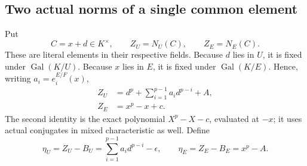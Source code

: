 \documentclass[11pt]{amsart}
\theoremstyle{definition}
\theoremstyle{remark}
\newcommand{\Gal}{\operatorname{Gal}}
\begin{document}
\subsection{Two actual norms of a single common element}
Put
\begin{equation}\label{O:I:commonC}
 C=x+d\in K^\times,\qquad Z_U=N_U(C),\qquad Z_E=N_E(C).
\end{equation}
These are literal elements in their respective fields. Because $d$ lies in
$U$, it is fixed under $\Gal(K/U)$. Because $x$ lies in $E$, it is fixed
under $\Gal(K/E)$. Hence, writing $a_i=e_i^{E/F}(x)$,
\begin{align}
 Z_U&=d^p+\sum_{i=1}^{p-1}a_i d^{p-i}+A,\label{O:I:ZU}\\
 Z_E&=x^p-x+c.\label{O:I:ZE}
\end{align}
The second identity is the exact polynomial $X^p-X-c$, evaluated at $-x$;
it uses actual conjugates in mixed characteristic as well.
Define
\[
 \eta_U=Z_U-B_U=\sum_{i=1}^{p-1}a_i d^{p-i}-\epsilon,
 \qquad \eta_E=Z_E-B_E=x^p-A.
\]
\end{document}
